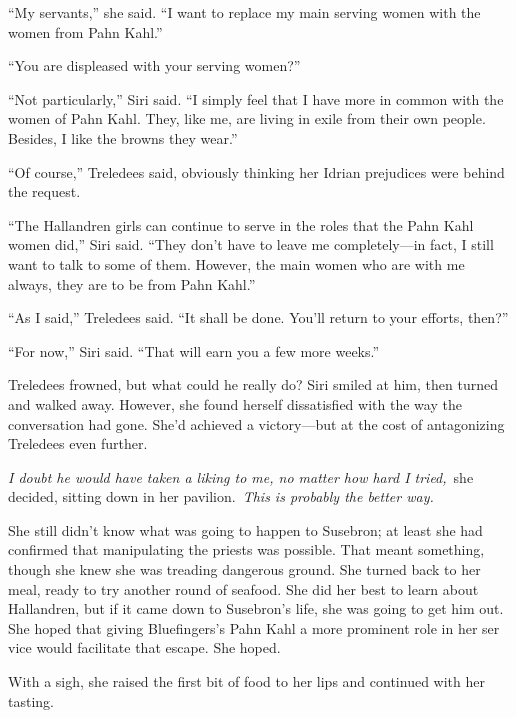 “My servants,” she said. “I want to replace my main serving women with the women from Pahn Kahl.”

“You are displeased with your serving women?”

“Not particularly,” Siri said. “I simply feel that I have more in common with the women of Pahn Kahl. They, like me, are living in exile from their own people. Besides, I like the browns they wear.”

“Of course,” Treledees said, obviously thinking her Idrian prejudices were behind the request.

“The Hallandren girls can continue to serve in the roles that the Pahn Kahl women did,” Siri said. “They don’t have to leave me completely—in fact, I still want to talk to some of them. However, the main women who are with me always, they are to be from Pahn Kahl.”

“As I said,” Treledees said. “It shall be done. You’ll return to your efforts, then?”

“For now,” Siri said. “That will earn you a few more weeks.”

Treledees frowned, but what could he really do? Siri smiled at him, then turned and walked away. However, she found herself dissatisfied with the way the conversation had gone. She’d achieved a victory—but at the cost of antagonizing Treledees even further.

\textit{I doubt he would have taken a liking to me, no matter how hard I tried,}~she decided, sitting down in her pavilion.~\textit{This is probably the better way.}

She still didn’t know what was going to happen to Susebron; at least she had confirmed that manipulating the priests was possible. That meant something, though she knew she was treading dangerous ground. She turned back to her meal, ready to try another round of seafood. She did her best to learn about Hallandren, but if it came down to Susebron’s life, she was going to get him out. She hoped that giving Bluefingers’s Pahn Kahl a more prominent role in her ser vice would facilitate that escape. She hoped.

With a sigh, she raised the first bit of food to her lips and continued with her tasting.

